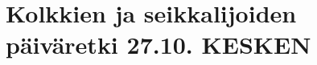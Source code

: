 
\section{Kolkkien ja seikkalijoiden päiväretki 27.10. KESKEN}

\begin{multicols}{2}
\end{multicols}
